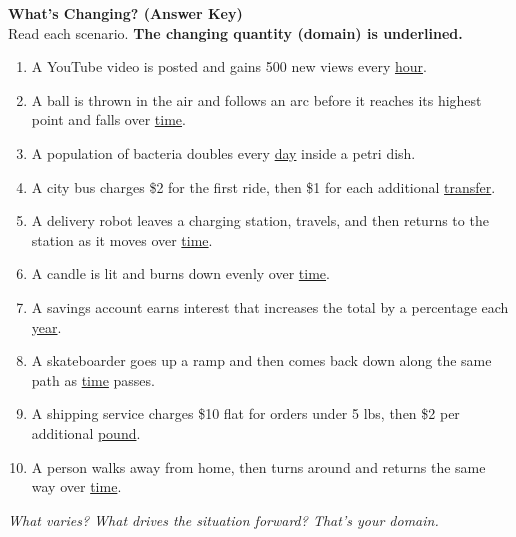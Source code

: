 \documentclass[12pt,landscape]{article}
\begin{document}
\noindent
\begin{minipage}[t]{0.48\textwidth}
\raggedright

\Large\textbf{What's Changing? (Answer Key)} \\
\normalsize
\vspace{1em}
Read each scenario. \textbf{The changing quantity (domain) is underlined.}

\vspace{1em}
\begin{enumerate}
  \item A YouTube video is posted and gains 500 new views every \underline{hour}.
  \item A ball is thrown in the air and follows an arc before it reaches its highest point and falls over \underline{time}.
  \item A population of bacteria doubles every \underline{day} inside a petri dish.
  \item A city bus charges \$2 for the first ride, then \$1 for each additional \underline{transfer}.
  \item A delivery robot leaves a charging station, travels, and then returns to the station as it moves over \underline{time}.
  \item A candle is lit and burns down evenly over \underline{time}.
  \item A savings account earns interest that increases the total by a percentage each \underline{year}.
  \item A skateboarder goes up a ramp and then comes back down along the same path as \underline{time} passes.
  \item A shipping service charges \$10 flat for orders under 5 lbs, then \$2 per additional \underline{pound}.
  \item A person walks away from home, then turns around and returns the same way over \underline{time}.
\end{enumerate}

\vfill
\small\textit{What varies? What drives the situation forward? That’s your domain.}
\end{minipage}%
\hfill
\end{document}
